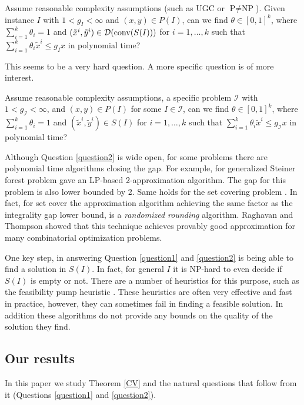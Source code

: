 \begin{question}\label{question1}
	Assume reasonable complexity assumptions (such as UGC or $\textrm{P}\neq \textrm{NP}$). Given instance $I$ with $1<g_I<\infty$ and $(x,y)\in P(I)$, can we find $\theta \in [0,1]^k$, where $\sum_{i=1}^{k}\theta_i =1$ and $(\tilde{x}^i,\tilde{y}^i)\in \operatorname{\mathcal{D}}(\operatorname{conv}(S(I)))$ for $i=1,\ldots,k$ such that $\sum_{i=1}^{k}\theta_i \tilde{x}^i\leq g_Ix$ in polynomial time?
\end{question}

This seems to be a very hard question. A more specific question is of more interest.

\begin{question}\label{question2}
	Assume reasonable complexity assumptions, a specific problem $\mathcal{I}$ with  $1<g_{\mathcal{I}}<\infty$, and $(x,y)\in P(I)$ for some $I\in \mathcal{I}$, can we find $\theta \in [0,1]^k$, where $\sum_{i=1}^{k}\theta_i =1$ and $(\tilde{x}^i,\tilde{y}^i)\in S(I)$ for $i=1,\ldots,k$ such that $\sum_{i=1}^{k}\theta_i \tilde{x}^i\leq g_{\mathcal{I}}x$ in polynomial time?
\end{question}
Although Question \ref{question2} is wide open, for some problems there are polynomial time algorithms closing the gap. For example, for generalized Steiner forest problem \cite{jain} gave an LP-based 2-approximation algorithm. The gap for this problem is also lower bounded by 2. Same holds for the set covering problem \cite{randomizedrounding}. In fact, for set cover the approximation algorithm achieving the same factor as the integrality gap lower bound, is a \textit{randomized rounding} algorithm. Raghavan and Thompson \cite{randomizedrounding} showed that this technique achieves provably good approximation for many combinatorial optimization problems.  

One key step, in answering Question \ref{question1} and \ref{question2} is being able to find a solution in $S(I)$. In fact, for general $I$ it is NP-hard to even decide if $S(I)$ is empty or not. There are a number of heuristics for this purpose, such as the feasibility pump heuristic \cite{fp1,fp2}. These heuristics are often very effective and fast in practice, however, they can sometimes fail in finding a feasible solution. In addition these algorithms do not provide any bounds on the quality of the solution they find.
\subsection{Our results}
In this paper we study Theorem \ref{CV} and the natural questions that follow from it (Questions \ref{question1} and \ref{question2}).

